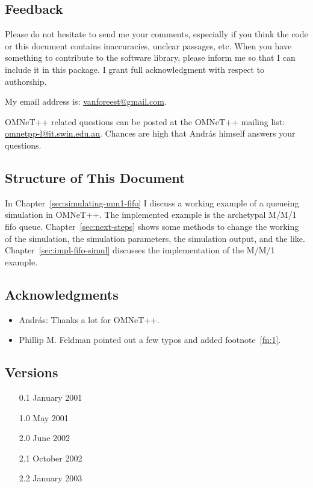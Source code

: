 \documentclass[a4paper]{article}
\begin{document}
\subsection{Feedback}
\label{sec:feedback}
Please do not hesitate to send me your comments, especially if you
think the code or this document contains inaccuracies, unclear
passages, etc. When you have something to contribute to the software
library, please inform me so that I can include it in this package. I
grant full acknowledgment with respect to authorship.

My email address is: \url{vanforeest@gmail.com}.

OMNeT++ related questions can be posted at the OMNeT++ mailing list:
\url{omnetpp-l@it.swin.edu.au}. Chances are high that Andr{\'a}s himself
answers your questions.


\subsection{Structure of This Document}
\label{sec:struct-this-docum}
In Chapter~\ref{sec:simulating-mm1-fifo} I discuss a working example
of a queueing simulation in OMNeT++.  The implemented example is the
archetypal M/M/1 fifo queue.  Chapter~\ref{sec:next-steps} shows some
methods to change the working of the simulation, the simulation
parameters, the simulation output, and the like.
Chapter~\ref{sec:impl-fifo-simul} discusses the
implementation of the M/M/1 example.

\subsection{Acknowledgments}
\label{sec:acknowledgements}
\begin{itemize}
\item Andr{\'a}s: Thanks a lot for OMNeT++.
\item Phillip M. Feldman pointed out a few typos and added footnote~\ref{fn:1}.

\end{itemize}

\subsection{Versions}
\begin{enumerate}
\item[0.1] January 2001
\item[1.0] May 2001
\item[2.0] June 2002
\item[2.1] October 2002
\item[2.2] January 2003
\end{enumerate}
\end{document}
